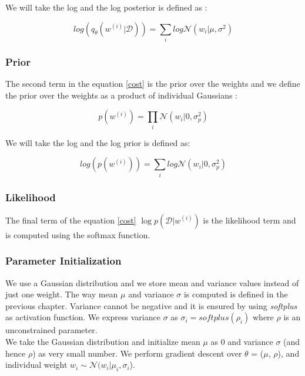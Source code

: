 We will take the log and the log posterior is defined as :

\begin{equation}
    log(q_{\theta}(w^{(i)}|\mathcal{D}))= \sum_{i}log \mathcal{N}(w_{i} | \mu,\sigma^2)
\end{equation}

\subsubsection{Prior}

The second term in the equation \eqref{cost} is the prior over the weights and we define the prior over the weights as a product of individual Gaussians :

\begin{equation}
    p(w^{(i)})= \prod_{i} \mathcal{N}(w_{i} | 0,\sigma_{p}^2)
\end{equation}

We will take the log and the log prior is defined as:

\begin{equation}
    log (p(w^{(i)}))= \sum_{i} log \mathcal{N}(w_{i} | 0,\sigma_{p}^2)
\end{equation}

\subsubsection{ Likelihood }

The final term of the equation \eqref{cost} $\log p(\mathcal{D}|w^{(i)})$ is the likelihood term and is computed using the softmax function.

\subsubsection{Parameter Initialization}

We use a Gaussian distribution and we store mean and variance values instead of just one weight. The way mean $\mu$ and variance $\sigma$ is computed is defined in the previous chapter. Variance cannot be negative and it is ensured by using \textit{softplus} as activation function. We express variance $\sigma$ as $\sigma_{i}=softplus(\rho_{i})$ where $\rho$ is an unconstrained parameter. \\

We take the Gaussian distribution and initialize mean $\mu$ as 0 and variance $\sigma$ (and hence $\rho$) as very small number. We perform gradient descent over $\theta$ = ($\mu$, $\rho$), and individual weight $w_{i} \sim \mathcal{N} (w_{i} | \mu_{i}, \sigma_{i}$).  

